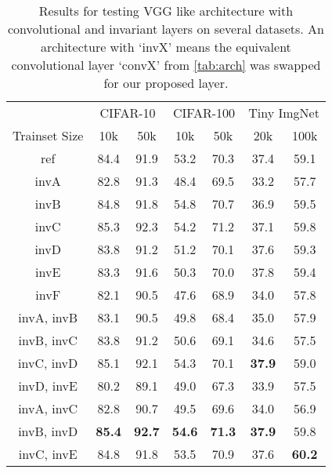 \begin{table}
  \centering
  \caption{Results for testing VGG like architecture with convolutional and
  invariant layers on several datasets. An architecture with `invX' means the
  equivalent convolutional layer `convX' from \autoref{tab:arch} was swapped for
  our proposed layer.}
  \begin{tabular}{c|cc|cc|cc}
    & \multicolumn{2}{c|}{CIFAR-10} & \multicolumn{2}{c|}{CIFAR-100} & \multicolumn{2}{c}{Tiny ImgNet} \\ \cline{2-7}
    Trainset Size& 10k   &  50k  &  10k  &  50k & 20k & 100k \\ \hline
    ref & 84.4  & 91.9  & 53.2  & 70.3 & 37.4 & 59.1 \\ \hline
    invA & 82.8 & 91.3 & 48.4 & 69.5 & 33.2 & 57.7 \\
    invB & 84.8 & 91.8  & 54.8  & 70.7 & 36.9& 59.5 \\
    invC & 85.3 & 92.3 & 54.2 & 71.2 & 37.1& 59.8\\
    invD& 83.8 & 91.2 & 51.2 & 70.1 & 37.6 & 59.3 \\
    invE& 83.3 & 91.6 & 50.3 & 70.0 & 37.8 & 59.4\\
    invF& 82.1 & 90.5& 47.6& 68.9 & 34.0 & 57.8\\ \hline
    invA, invB& 83.1& 90.5 & 49.8 & 68.4 & 35.0 & 57.9\\
    invB, invC& 83.8& 91.2 & 50.6 & 69.1 & 34.6 & 57.5\\
    invC, invD& 85.1 & 92.1 & 54.3 & 70.1 & \textbf{37.9} & 59.0\\
    invD, invE& 80.2 & 89.1 & 49.0 & 67.3 & 33.9 & 57.5\\
    invA, invC& 82.8 & 90.7 & 49.5 & 69.6 & 34.0 & 56.9\\
    invB, invD& \textbf{85.4} & \textbf{92.7} & \textbf{54.6} & \textbf{71.3} & \textbf{37.9} & 59.8\\
    invC, invE& 84.8 & 91.8 & 53.5 & 70.9 & 37.6 & \textbf{60.2}\\
  \end{tabular}\label{tab:conv_results}
\end{table}

